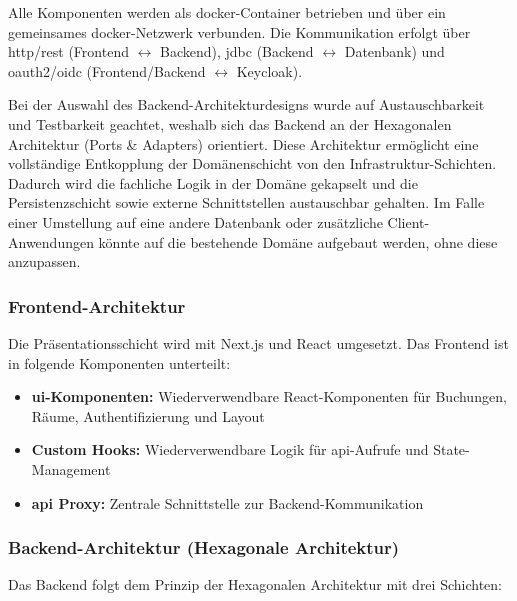 \documentclass[11pt,a4paper]{report}
\begin{document}
Alle Komponenten werden als \gls{docker}-Container betrieben und über ein gemeinsames \gls{docker}-Netzwerk verbunden. Die Kommunikation erfolgt über \gls{http}/\gls{rest} (Frontend $\leftrightarrow$ Backend), \gls{jdbc} (Backend $\leftrightarrow$ Datenbank) und \gls{oauth2}/\gls{oidc} (Frontend/Backend $\leftrightarrow$ Keycloak).

Bei der Auswahl des Backend-Architekturdesigns wurde auf Austauschbarkeit und Testbarkeit geachtet, weshalb sich das Backend an der Hexagonalen Architektur (Ports \& Adapters) orientiert. Diese Architektur ermöglicht eine vollständige Entkopplung der Domänenschicht von den Infrastruktur-Schichten. Dadurch wird die fachliche Logik in der Domäne gekapselt und die Persistenzschicht sowie externe Schnittstellen austauschbar gehalten. Im Falle einer Umstellung auf eine andere Datenbank oder zusätzliche Client-Anwendungen könnte auf die bestehende Domäne aufgebaut werden, ohne diese anzupassen.

\subsubsection*{Frontend-Architektur}

Die Präsentationsschicht wird mit Next.js und React umgesetzt. Das Frontend ist in folgende Komponenten unterteilt:

\begin{itemize}
    \item \textbf{\gls{ui}-Komponenten:} Wiederverwendbare React-Komponenten für Buchungen, Räume, Authentifizierung und Layout
    \item \textbf{Custom Hooks:} Wiederverwendbare Logik für \gls{api}-Aufrufe und State-Management
    \item \textbf{\gls{api} Proxy:} Zentrale Schnittstelle zur Backend-Kommunikation
\end{itemize}

\subsubsection*{Backend-Architektur (Hexagonale Architektur)}

Das Backend folgt dem Prinzip der Hexagonalen Architektur mit drei Schichten:
\end{document}
